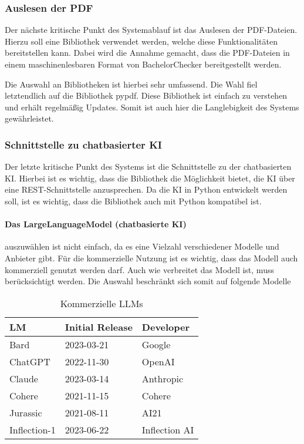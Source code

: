 \subsubsection{Auslesen der PDF}\label{subsubsec:pdf}
Der nächste kritische Punkt des Systemablauf ist das Auslesen der PDF-Dateien.
Hierzu soll eine Bibliothek verwendet werden, welche diese Funktionalitäten bereitstellen kann.
Dabei wird die Annahme gemacht, dass die PDF-Dateien in einem maschinenlesbaren Format von BachelorChecker bereitgestellt werden.

Die Auswahl an Bibliotheken ist hierbei sehr umfassend.
Die Wahl fiel letztendlich auf die Bibliothek pypdf.
Diese Bibliothek ist einfach zu verstehen und erhält regelmäßig Updates.
Somit ist auch hier die Langlebigkeit des Systems gewährleistet.

\subsubsection{Schnittstelle zu chatbasierter KI}\label{subsubsec:ki}
Der letzte kritische Punkt des Systems ist die Schnittstelle zu der chatbasierten KI.
Hierbei ist es wichtig, dass die Bibliothek die Möglichkeit bietet, die KI über eine REST-Schnittstelle anzusprechen.
Da die KI in Python entwickelt werden soll, ist es wichtig, dass die Bibliothek auch mit Python kompatibel ist.

\paragraph{Das LargeLanguageModel (chatbasierte KI)} auszuwählen ist nicht einfach,
da es eine Vielzahl verschiedener Modelle und Anbieter gibt.
Für die kommerzielle Nutzung ist es wichtig, dass das Modell auch kommerziell genutzt werden darf.
Auch wie verbreitet das Modell ist, muss berücksichtigt werden.
Die Auswahl beschränkt sich somit auf folgende Modelle

\begin{table}[H]
    \begin{tabularx}{\textwidth}{lll}
        \toprule
        \textbf{LM}  & \textbf{Initial Release} & \textbf{Developer} \\
        \midrule
        Bard         & 2023-03-21               & Google             \\
        ChatGPT      & 2022-11-30               & OpenAI             \\
        Claude       & 2023-03-14               & Anthropic          \\
        Cohere       & 2021-11-15               & Cohere             \\
        Jurassic     & 2021-08-11               & AI21               \\
        Inflection-1 & 2023-06-22               & Inflection AI      \\
        \bottomrule
    \end{tabularx}
    \caption{Kommerzielle LLMs}\autocite{sapling.llmindex}
    \label{tab:kommerzielle-llms}
\end{table}

